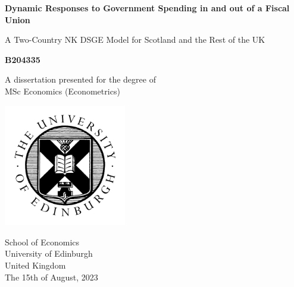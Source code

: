 \begin{titlepage}
    \begin{center}
        \vspace*{1cm}
        \LARGE
        \textbf{Dynamic Responses to Government Spending in and out of a Fiscal Union}
 
        \vspace{0.5cm}
        A Two-Country NK DSGE Model for Scotland and the Rest of the UK
             
        \vspace{1.5cm}
 
        \textbf{B204335}
 
        \vfill
             
        A dissertation presented for the degree of\\
        MSc Economics (Econometrics) 
             
        \vspace{0.8cm}
      
        \includegraphics[width=0.4\textwidth]{./Title Page/uoe_logo.png}
             
        School of Economics\\
        University of Edinburgh\\
        United Kingdom\\
        The 15th of August, 2023
             
    \end{center}
 \end{titlepage}